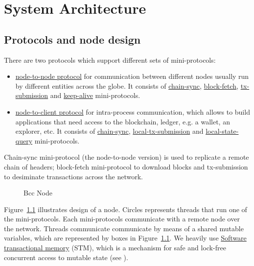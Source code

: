 \chapter{System Architecture}

\section{Protocols and node design}
There are two protocols which support different sets of mini-protocols:
\begin{itemize}
  \item\hyperref[section:node-to-node-protocol]{node-to-node protocol}
    for communication between different nodes usually run by different
    entities across the globe.  It consists of
    \hyperref[chain-sync-protocol]{chain-sync},
    \hyperref[block-fetch-protocol]{block-fetch},
    \hyperref[tx-submission-protocol]{tx-submission} and
    \hyperref[keep-alive-protocol]{keep-alive} mini-protocols.
  \item\hyperref[section:node-to-client-protocol]{node-to-client
    protocol} for intra-process communication, which allows to build
    applications that need access to the blockchain, ledger, e.g. a wallet, an
    explorer, etc.  It consists of \hyperref[chain-sync-protocol]{chain-sync},
    \hyperref[local-tx-submission-protocol]{local-tx-submission} and
    \hyperref[local-state-query-protocol]{local-state-query} mini-protocols.
\end{itemize}

Chain-sync mini-protocol (the node-to-node version) is used to replicate
a remote chain of headers; block-fetch mini-protocol to download blocks and
tx-submission to desiminate transactions across the network.

\begin{figure}
  \begin{center}
  \end{center}
  \caption{Bcc Node}
  \label{node-diagram-concurrency}
\end{figure}

Figure~\ref{node-diagram-concurrency} illustrates design of a node.  Circles
represents threads that run one of the mini-protocols.  
Each mini-protocols communicate with a remote node over the network.
Threads communicate communicate by means of a shared mutable variables, which
are represented by boxes in Figure~\ref{node-diagram-concurrency}.
We heavily use
\href{https://en.wikipedia.org/wiki/Software_transactional_memory}{Software
transactional memory} (STM), which is a mechanism for safe and lock-free
concurrent access to mutable state (see \cite{stm:harris2006}).

